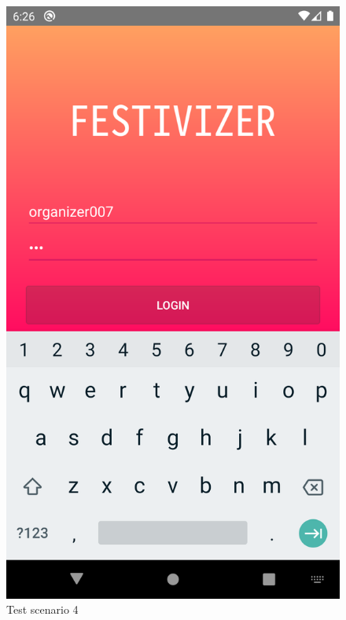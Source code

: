 			\begin{figure}[H]
				\includegraphics[width=\linewidth]{images/test_Screens/test_scenario_4-1.png}
				\caption{Test scenario 4}
				\label{fig:espresso_4_1}
			\end{figure}
			

